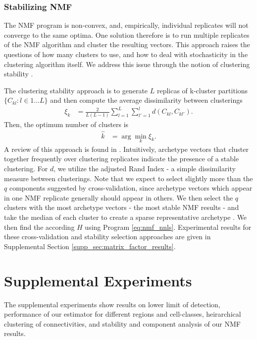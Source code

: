 \subsubsection{Stabilizing NMF}

The NMF program is non-convex, and, empirically, individual replicates will not converge to the same optima.
One solution therefore is to run multiple replicates of the NMF algorithm and cluster the resulting vectors.
This approach raises the questions of how many clusters to use, and how to deal with stochasticity in the clustering algorithm itself.
We address this issue through the notion of clustering stability \citep{Von_Luxburg2010-lu}.

The clustering stability approach is to generate $L$ replicas of k-cluster partitions $\{C_{kl} : l \in 1 \dots L\}$ and then compute the average dissimilarity between clusterings
\begin{align*}
\xi_k &= \frac{2}{L(L - 1)} \sum_{l = 1}^{L} \sum_{l'= 1}^{l}  d(C_{kl}, C_{kl'}).
\end{align*}
Then, the optimum number of clusters is 
\begin{align*}
\hat k &= \arg \min_k \xi_k.
\end{align*}
A review of this approach is found in \citet{Von_Luxburg2010-qe}.
Intuitively, archetype vectors that cluster together frequently over clustering replicates indicate the presence of a stable clustering.
For $d$, we utilize the adjusted Rand Index - a simple dissimilarity measure between clusterings.
Note that we expect to select slightly more than the $q$ components suggested by cross-validation, since archetype vectors which appear in one NMF replicate generally should appear in others.
We then select the $q$ clusters with the most archetype vectors - the most stable NMF results - and take the median of each cluster to create a sparse representative archetype \citep{Wu2016-gg, Kotliar2019-yj}.
We then find the according $H$ using Program \ref{eq:nmf_nnls}.
Experimental results for these cross-validation and stability selection approaches are given in Supplemental Section \ref{supp_sec:matrix_factor_results}.

\newpage

\section{Supplemental Experiments}
\label{supp_sec:exp}

The supplemental experiments show results on lower limit of detection, performance of our estimator for different regions and cell-classes, heirarchical clustering of connectivities, and stability and component analysis of our NMF results.

